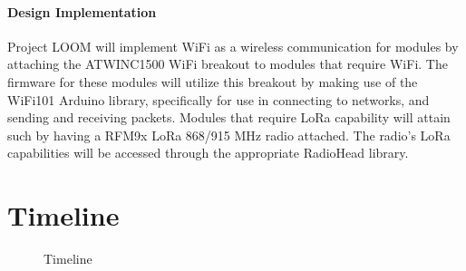 \documentclass[onecolumn, draftclsnofoot,10pt, compsoc]{IEEEtran}
\begin{document}
\paragraph{Design Implementation}
    Project LOOM will implement WiFi as a wireless communication for modules by attaching the ATWINC1500 WiFi breakout to modules that require WiFi. The firmware for these modules will utilize this breakout by making use of the WiFi101 Arduino library, specifically for use in connecting to networks, and sending and receiving packets. Modules that require LoRa capability will attain such by having a RFM9x LoRa 868/915 MHz radio attached. The radio's LoRa capabilities will be accessed through the appropriate RadioHead library. 





\section{Timeline}
    \begin{figure}[H]
        \caption{Timeline}
        \label{fig:gantt_chart}
        \noindent{}
    \end{figure}
\end{document}
